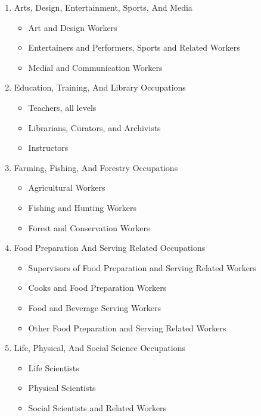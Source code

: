 \documentclass{article}
\begin{document}
\begin{enumerate}
    \item Arts, Design, Entertainment, Sports, And Media
        \begin{itemize}
            \item Art and Design Workers
            \item Entertainers and Performers, Sports and Related Workers
            \item Medial and Communication Workers
        \end{itemize}
    \item  Education, Training, And Library Occupations
        \begin{itemize}
            \item Teachers, all levels
            \item Librarians, Curators, and Archivists
            \item Instructors
        \end{itemize}
    \item  Farming, Fishing, And Forestry Occupations
        \begin{itemize}
            \item  Agricultural Workers
            \item Fishing and Hunting Workers
            \item Forest and Conservation Workers
        \end{itemize}
    \item  Food Preparation And Serving Related Occupations
        \begin{itemize}
            \item Supervisors of Food Preparation and Serving Related Workers
            \item Cooks and Food Preparation Workers
            \item Food and Beverage Serving Workers
            \item Other Food Preparation and Serving Related Workers
        \end{itemize}
    \item  Life, Physical, And Social Science Occupations
        \begin{itemize}
            \item Life Scientists
            \item Physical Scientists
            \item Social Scientists and Related Workers
        \end{itemize}

\end{enumerate}
\end{document}

